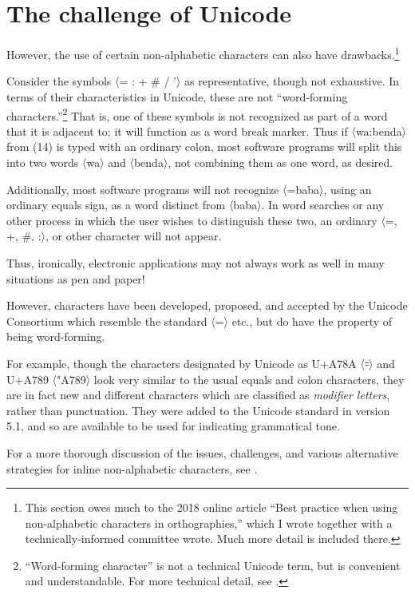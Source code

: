\documentclass[output=paper]{langscibook}
\begin{document}
\section{The challenge of Unicode}\label{sec:cahill:4}
However, the use of certain non-alphabetic characters can also have drawbacks.\footnote{This section owes much to the 2018 online article \citep{International2018} “Best practice when using non-alphabetic characters in orthographies,” which I wrote together with a technically-informed committee wrote. Much more detail is included there.}

Consider the symbols 〈=  : +   \#  /  '〉 as representative, though not exhaustive. In terms of their characteristics in Unicode, these are not “word-forming characters.”\footnote{“Word-forming character” is not a technical Unicode term, but is convenient and understandable. For more technical detail, see \citet{International2018}.}  That is, one of these symbols is not recognized as part of a word that it is adjacent to; it will function as a word break marker.  Thus if 〈wa:benda〉 from (14) is typed with an ordinary colon, most software programs will split this into two words 〈wa〉 and  〈benda〉, not combining them as one word, as desired. 

Additionally, most software programs will not recognize 〈=baba〉, using an ordinary equals sign, as a word distinct from 〈baba〉. In word searches or any other process in which the user wishes to distinguish these two, an ordinary 〈=, +, \#, :〉, or other character will not appear.  

Thus, ironically, electronic applications may not always work as well in many situations as pen and paper!

However, characters have been developed, proposed, and accepted by the Unicode Consortium which resemble the standard 〈=〉 etc., but do have the property of being word-forming. 

For example, though the characters designated by Unicode as U+A78A 〈꞊〉 and U+A789 〈\char"A789〉 look very similar to the usual equals and colon characters, they are in fact new and different characters which are classified as \textit{modifier letters}, rather than punctuation. They were added to the Unicode standard in version 5.1, and so are available to be used for indicating grammatical tone.

For a more thorough discussion of the issues, challenges, and various alternative strategies for inline non-alphabetic characters, see \citep{International2018}. 
\end{document}
